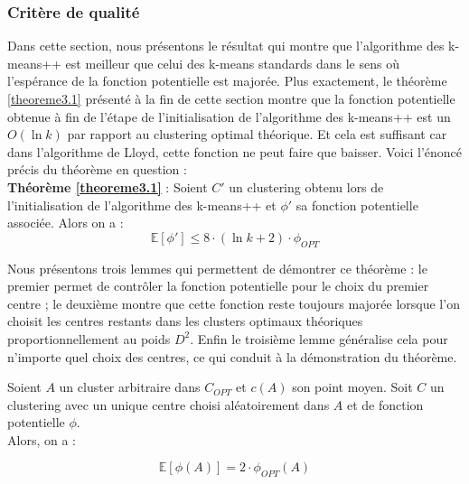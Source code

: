 \documentclass[12pt,a4paper]{book}
\newcommand{\E}{\mathbb{E}}
\newcommand{\1}{\mathds{1}}
\begin{document}
\subsubsection{Critère de qualité}

Dans cette section, nous présentons le résultat qui montre que l'algorithme des k-means++ est meilleur que celui des k-means standards dans le sens où l'espérance de la fonction potentielle est majorée. Plus exactement, le théorème \ref{theoreme3.1} présenté à la fin de cette section montre que la fonction potentielle obtenue à fin de l'étape de l'initialisation de l'algorithme des k-means++ est un $O(\ln k)$ par rapport au clustering optimal théorique. Et cela est suffisant car dans l'algorithme de Lloyd, cette fonction ne peut faire que baisser. Voici l'énoncé précis du théorème en question : \\

\textbf{Théorème \ref{theoreme3.1}} : Soient $C'$ un clustering obtenu lors de l'initialisation de l'algorithme des k-means++ et $\phi'$ sa fonction potentielle associée.
		Alors on a :
		$$
			\E[\phi'] \leq 8 \cdot \left(\ln k + 2 \right) \cdot \phi_{OPT}
		$$

Nous présentons trois lemmes qui permettent de démontrer ce théorème : le premier permet de contrôler la fonction potentielle pour le choix du premier centre ; le deuxième montre que cette fonction reste toujours majorée lorsque l'on choisit les centres restants dans les clusters optimaux théoriques proportionnellement au poids $D^2$. Enfin le troisième lemme généralise cela pour n'importe quel choix des centres, ce qui conduit à la démonstration du théorème.

	\begin{env_lemme}\label{lemme3.1}
		Soient $A$ un cluster arbitraire dans $C_{OPT}$ et $c(A)$ son point moyen. Soit $C$ un clustering avec un unique centre choisi aléatoirement dans $A$ et de fonction potentielle $\phi$.\\
		Alors, on a :
		
		$$
			\E\left[\phi(A)\right] = 2 \cdot \phi_{OPT} \left( A \right)
		$$		
	\end{env_lemme}	
	
\end{document}
